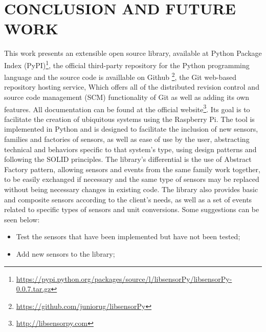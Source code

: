 \documentclass{acm_proc_article-sp}
\begin{document}
\section{CONCLUSION AND FUTURE WORK}
This work presents an extensible open source library, available at Python Package Index (PyPI)\footnote{\url{https://pypi.python.org/packages/source/l/libsensorPy/libsensorPy-0.0.7.tar.gz}}, the official third-party repository for the Python programming language and the source code is availlable on Github \footnote{\url{https://github.com/juniorug/libsensorPy}}, the Git web-based repository hosting service, Which offers all of the distributed revision control and source code management (SCM) functionality of Git as well as adding its own features. All documentation can be found at the official website\footnote{\url{http://libsensorpy.com}}.
\newline
\newline
Its goal is to facilitate the creation of ubiquitous systems using the Raspberry Pi. The tool is implemented in Python and is designed to facilitate the inclusion of new sensors, families and factories of sensors, as well as ease of use by the user, abstracting technical and behaviors specific to that system's type, using design patterns and following the SOLID principles.
\newline
\newline
The library's differential is the use of Abstract Factory pattern, allowing sensors and events from the same family work together, to be easily exchanged if necessary and the same type of sensors may be replaced without being necessary changes in existing code. The library also provides basic and composite  sensors according to the client's needs, as well as a set of events related to specific types of sensors and unit conversions.
\newline
\newline
Some suggestions can be seen below:
\begin{itemize}
\item Test the sensors that have been implemented but have not been tested;
\item Add new sensors to the library;

\end{itemize}



\appendix

\end{document}
